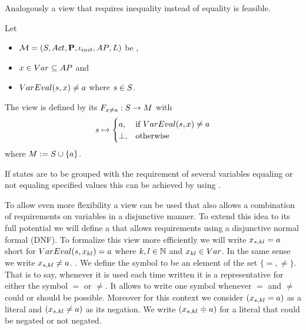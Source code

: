 \documentclass[preview]{standalone}
\begin{document}
Analogously a view that requires inequality instead of equality is feasible.

\begin{definition}
	Let
	\begin{itemize}
		\item $\chgph = \chgphtuple$ be \chosengraphtypeN,
		\item $\var \in \vars \subseteq \atomicprops$ and 
		\item $\vareval(\state, \var) \neq \varval$ where $\state \in \states$.		
	\end{itemize} 
	The view \viewparamvaluesneq is defined by its \grpfctN $\gfctparamvaluesneq : \states \to \imggrp$ with
	\[
	\state \mapsto
	\begin{cases}
		\varval, &\text{if } \vareval(\state, \var) \neq \varval\\
		\remelem, 	&\text{otherwise}
	\end{cases}
	\]
	where $\imggrp := \remset \cup \{a\}$.
\end{definition}

If states are to be grouped with the requirement of several variables equaling or not equaling specified values this can be achieved by using \parllcompN. 

To allow even more flexibility a view can be used that also allows a combination of requirements on variables in a disjunctive manner. To extend this idea to its full potential we will define a \viewN that allows requirements using a disjunctive normal formal (DNF). To formalize this view more efficiently we will write $\varstate[,kl] = \varval$ short for $\vareval(\state, \var_{kl}) = \varval$ where $k,l \in \natnums$ and $x_{kl} \in \vars$. In the same sense we write $\varstate[,kl] \neq \varval$. . We define the symbol \eqorneq to be an element of the set $\{=,\neq\}$. That is to say, whenever it is used each time written it is a representative for either the symbol $=$ or $\neq$. It allows to write one symbol whenever $=$ and $\neq$ could or should be possible. Moreover for this context we consider $(\varstate[,kl] = \varval)$ as a literal and $(\varstate[,kl] \neq \varval)$ as its negation. We write $(\varstate[,kl] \eqorneq \varval)$ for a literal that could be negated or not negated.
\end{document}
